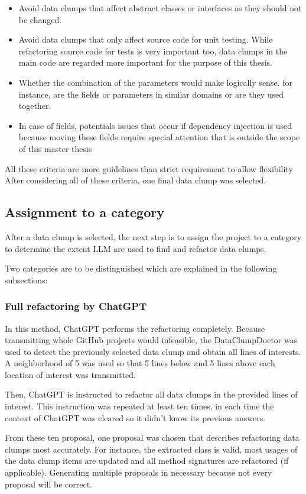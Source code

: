 \begin{itemize}
    \item Avoid data clumps that affect abstract classes or interfaces as they should not be changed.
    \item Avoid data clumps that only affect source code for unit testing. While refactoring source code for tests is very important too, data clumps in the main code are regarded more important for the purpose of this thesis.
    \item Whether the combination of the parameters would make logically sense. for instance, are the fields or parameters in similar domains or are they used together. 
    \item In case of fields, potentials issues that occur if dependency injection is used because moving these fields require special attention that is outside the scope of this master thesis
\end{itemize}
All these criteria are more guidelines than strict requirement to allow flexibility 
After considering all of these criteria, one final data clump was selected.
\subsection{Assignment to a category}

After a data clump is selected, the next step is to assign the project to a category to determine the extent \acs{LLM} are used to find and refactor data clumps. 

Two categories are to be distinguished which are explained in the following subsections:

\subsubsection{Full refactoring by ChatGPT}
In this method, ChatGPT performs the refactoring completely. Because transmitting whole GitHub projects would infeasible, the DataClumpDoctor was used to detect the previously selected data clump and obtain all lines of interests. A neighborhood of 5 was used so that 5 lines below and 5 lines above each location of interest was transmitted. 

Then, ChatGPT is instructed to refactor all data clumps in the provided lines of interest. This instruction was repeated at least ten times, in each time the context of ChatGPT was cleared so it didn't know its previous answers. 

From these ten proposal, one proposal was chosen that describes refactoring data clumps most accurately. For instance, the extracted class is valid, most usages of the data clump items are updated and all method signatures are refactored (if applicable). Generating multiple proposals in necessary because not every proposal will be correct.

